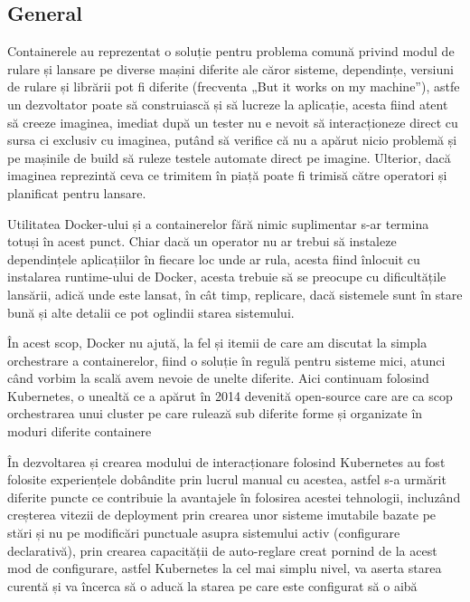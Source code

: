 \subsection{General}

Containerele au reprezentat o soluție pentru problema comună privind modul de rulare și
lansare pe diverse mașini diferite ale căror sisteme, dependințe, versiuni de rulare și 
librării pot fi diferite (frecventa „But it works on my machine”), astfe un dezvoltator poate să
construiască și să lucreze la aplicație, acesta fiind atent să creeze imaginea, imediat după
un tester nu e nevoit să interacționeze direct cu sursa ci exclusiv cu imaginea, putând să 
verifice că nu a apărut nicio problemă și pe mașinile de build să ruleze testele automate direct pe imagine.
Ulterior, dacă imaginea reprezintă ceva ce trimitem în piață poate fi trimisă către operatori și
planificat pentru lansare.

Utilitatea Docker-ului și a containerelor fără nimic suplimentar s-ar termina totuși în acest punct.
Chiar dacă un operator nu ar trebui să instaleze dependințele aplicațiilor în fiecare loc unde ar rula,
acesta fiind înlocuit cu instalarea runtime-ului de Docker, acesta trebuie să se preocupe 
cu dificultățile lansării, adică unde este lansat, în cât timp, replicare, dacă sistemele
sunt în stare bună și alte detalii ce pot oglindii starea sistemului.

În acest scop, Docker nu ajută, la fel și itemii de care am discutat la simpla orchestrare a containerelor,
fiind o soluție în regulă pentru sisteme mici, atunci când vorbim la scală avem nevoie de unelte diferite.
Aici continuam folosind Kubernetes, o unealtă ce a apărut în 2014 devenită open-source 
care are ca scop orchestrarea unui cluster pe care rulează sub diferite forme și organizate
în moduri diferite containere

În dezvoltarea și crearea modului de interacționare folosind Kubernetes au fost folosite experiențele 
dobândite prin lucrul manual cu acestea, astfel s-a urmărit diferite puncte ce 
contribuie la avantajele în folosirea acestei tehnologii, incluzând creșterea vitezii de deployment
prin crearea unor sisteme imutabile bazate pe stări și nu pe modificări punctuale asupra sistemului
activ (configurare declarativă), prin crearea capacității de auto-reglare creat pornind
de la acest mod de configurare, astfel Kubernetes la cel mai simplu nivel, 
va aserta starea curentă și va încerca să o aducă la starea pe care este configurat să o aibă

